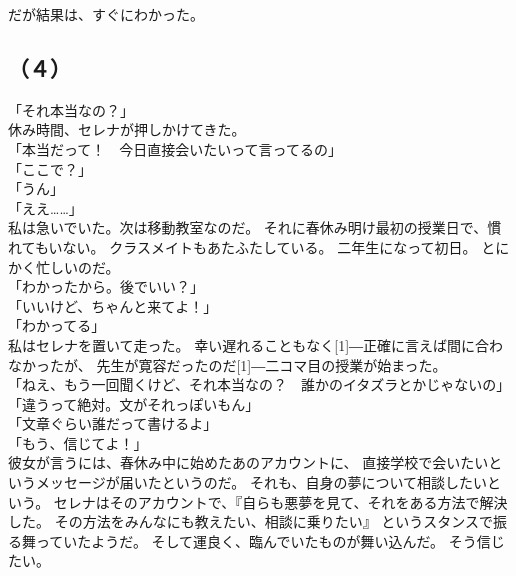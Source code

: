 \documentclass[../IHMain]{subfiles}
\begin{document}
だが結果は、すぐにわかった。

\subsection*{（４）}
「それ本当なの？」\\
休み時間、セレナが押しかけてきた。\\
「本当だって！　今日直接会いたいって言ってるの」\\
「ここで？」\\
「うん」\\
「ええ……」\\
私は急いでいた。次は移動教室なのだ。
それに春休み明け最初の授業日で、慣れてもいない。
クラスメイトもあたふたしている。
二年生になって初日。
とにかく忙しいのだ。\\
「わかったから。後でいい？」\\
「いいけど、ちゃんと来てよ！」\\
「わかってる」\\
私はセレナを置いて走った。
幸い遅れることもなく\scalebox{3}[1]{―}正確に言えば間に合わなかったが、
先生が寛容だったのだ\scalebox{3}[1]{―}二コマ目の授業が始まった。\\

「ねえ、もう一回聞くけど、それ本当なの？　誰かのイタズラとかじゃないの」\\
「違うって絶対。文がそれっぽいもん」\\
「文章ぐらい誰だって書けるよ」\\
「もう、信じてよ！」\\
彼女が言うには、春休み中に始めたあのアカウントに、
直接学校で会いたいというメッセージが届いたというのだ。
それも、自身の夢について相談したいという。
セレナはそのアカウントで、『自らも悪夢を見て、それをある方法で解決した。
その方法をみんなにも教えたい、相談に乗りたい』
というスタンスで振る舞っていたようだ。
そして運良く、臨んでいたものが舞い込んだ。
そう信じたい。
\end{document}
